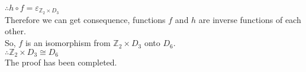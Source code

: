 \documentclass[12pt]{article}
\theoremstyle{neosn}
\begin{document}
    $\therefore h \circ f = \varepsilon_{\mathbb{Z}_2\times D_3}$\\
    Therefore we can get consequence, functions $f$ and $h$ are inverse functions of each other.\\
    So, $f$ is an isomorphism from $\mathbb{Z}_2\times D_3$ onto $D_6$.\\
    $\therefore \mathbb{Z}_2\times D_3 \cong D_6 $\\
    The proof has been completed.\\

\end{document}
